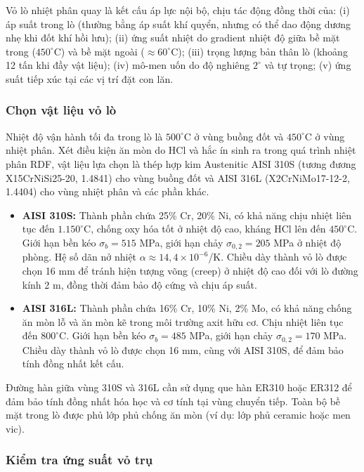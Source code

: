 \documentclass[../main.tex]{subfiles}
\begin{document}
Vỏ lò nhiệt phân quay là kết cấu áp lực nội bộ, chịu tác động đồng thời của: (i) áp suất trong lò (thường bằng áp suất khí quyển, nhưng có thể dao động dương nhẹ khi đốt khí hồi lưu); (ii) ứng suất nhiệt do gradient nhiệt độ giữa bề mặt trong ($450^\circ\mathrm{C}$) và bề mặt ngoài ($\approx 60^\circ\mathrm{C}$); (iii) trọng lượng bản thân lò (khoảng 12 tấn khi đầy vật liệu); (iv) mô-men uốn do độ nghiêng $2^\circ$ và tự trọng; (v) ứng suất tiếp xúc tại các vị trí đặt con lăn.

\subsubsection{Chọn vật liệu vỏ lò}

Nhiệt độ vận hành tối đa trong lò là $500^\circ\mathrm{C}$ ở vùng buồng đốt và $450^\circ\mathrm{C}$ ở vùng nhiệt phân. Xét điều kiện ăn mòn do HCl và hắc ín sinh ra trong quá trình nhiệt phân RDF, vật liệu lựa chọn là thép hợp kim Austenitic AISI 310S (tương đương X15CrNiSi25-20, 1.4841) cho vùng buồng đốt và AISI 316L (X2CrNiMo17-12-2, 1.4404) cho vùng nhiệt phân và các phần khác.

\begin{itemize}
    \item \textbf{AISI 310S:} Thành phần chứa 25\% Cr, 20\% Ni, có khả năng chịu nhiệt liên tục đến $1.150^\circ\mathrm{C}$, chống oxy hóa tốt ở nhiệt độ cao, kháng HCl lên đến $450^\circ\mathrm{C}$. Giới hạn bền kéo $\sigma_b = 515$ MPa, giới hạn chảy $\sigma_{0,2} = 205$ MPa ở nhiệt độ phòng. Hệ số dãn nở nhiệt $\alpha \approx 14{,}4 \times 10^{-6}$/K. Chiều dày thành vỏ lò được chọn 16 mm để tránh hiện tượng võng (creep) ở nhiệt độ cao đối với lò đường kính 2 m, đồng thời đảm bảo độ cứng và chịu áp suất.
    \item \textbf{AISI 316L:} Thành phần chứa 16\% Cr, 10\% Ni, 2\% Mo, có khả năng chống ăn mòn lỗ và ăn mòn kẽ trong môi trường axit hữu cơ. Chịu nhiệt liên tục đến $800^\circ\mathrm{C}$. Giới hạn bền kéo $\sigma_b = 485$ MPa, giới hạn chảy $\sigma_{0,2} = 170$ MPa. Chiều dày thành vỏ lò được chọn 16 mm, cùng với AISI 310S, để đảm bảo tính đồng nhất kết cấu.
\end{itemize}

Đường hàn giữa vùng 310S và 316L cần sử dụng que hàn ER310 hoặc ER312 để đảm bảo tính đồng nhất hóa học và cơ tính tại vùng chuyển tiếp. Toàn bộ bề mặt trong lò được phủ lớp phủ chống ăn mòn (ví dụ: lớp phủ ceramic hoặc men vic).

\subsubsection{Kiểm tra ứng suất vỏ trụ}
\end{document}
